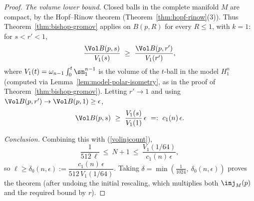\begin{proof}
\emph{The volume lower bound.} Closed balls in the complete
manifold $M$ are compact, by the Hopf--Rinow theorem
(Theorem~\ref{thm:hopf-rinow}(3)). Thus
Theorem~\ref{thm:bishop-gromov} applies on $B(p,R)$ for every
$R\le1$, with $k=1$: for $s<r'<1$,
$$\frac{\Vol B(p,s)}{V_1(s)}\ \ge\ \frac{\Vol B(p,r')}{V_1(r')},$$
where $V_1(t)=\omega_{n-1}\int_0^t\sn_1^{n-1}$ is the volume of
the $t$-ball in the model $H^n_1$ (computed via
Lemma~\ref{lem:model-polar-isometry}, as in the proof of
Theorem~\ref{thm:bishop-gromov}). Letting $r'\to1$ and using
$\Vol B(p,r')\to\Vol B(p,1)\ge\epsilon$,
$$\Vol B(p,s)\ \ge\ \frac{V_1(s)}{V_1(1)}\,\epsilon
\ =:\ c_1(n)\,\epsilon.$$

\emph{Conclusion.} Combining this with (\ref{volinjcount}),
$$\frac{1}{512\,\ell}\ \le\ N+1\ \le\
\frac{V_1(1/64)}{c_1(n)\,\epsilon},$$
so $\ell\ge\delta_0(n,\epsilon):=
\dfrac{c_1(n)\,\epsilon}{512\,V_1(1/64)}$. Taking
$\delta=\min\left(\tfrac1{1024},\ \delta_0(n,\epsilon)\right)$
proves the theorem (after undoing the initial rescaling, which
multiplies both $\inj_M(p)$ and the required bound by $r$).
\end{proof}
